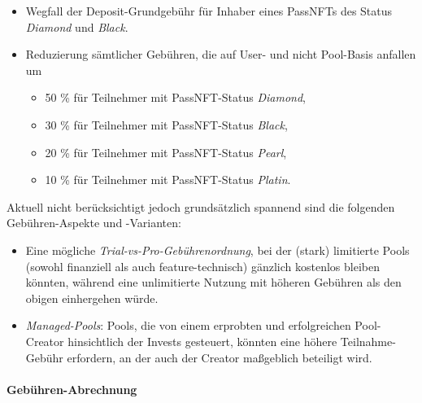 \begin{Assumption}[Gebühren]
\begin{itemize}
	\item Wegfall der Deposit-Grundgebühr für Inhaber eines PassNFTs des Status \textit{Diamond} und \textit{Black}.
	\item Reduzierung sämtlicher Gebühren, die auf User- und nicht Pool-Basis anfallen um
	\begin{itemize}
		\item 50 \% für Teilnehmer mit PassNFT-Status \textit{Diamond},
		\item 30 \% für Teilnehmer mit PassNFT-Status \textit{Black},
		\item 20 \% für Teilnehmer mit PassNFT-Status \textit{Pearl},
		\item 10 \% für Teilnehmer mit PassNFT-Status \textit{Platin}.
	\end{itemize}
\end{itemize}

\vspace{0.5cm}	

Aktuell nicht berücksichtigt jedoch grundsätzlich spannend sind die folgenden Gebühren-Aspekte und -Varianten:

\begin{itemize}
	\item Eine mögliche \textit{Trial-vs-Pro-Gebührenordnung}, bei der (stark) limitierte Pools (sowohl finanziell als auch feature-technisch) gänzlich kostenlos bleiben könnten, während eine unlimitierte Nutzung mit höheren Gebühren als den obigen einhergehen würde.
	\item \textit{Managed-Pools}: Pools, die von einem erprobten und erfolgreichen Pool-Creator hinsichtlich der Invests gesteuert, könnten eine höhere Teilnahme-Gebühr erfordern, an der auch der Creator maßgeblich beteiligt wird. 
\end{itemize}	

\end{Assumption}

\vspace{0.5cm}



\paragraph{Gebühren-Abrechnung}
\label{fees-charging}
\textbf{ }
\vspace{0.2cm}





